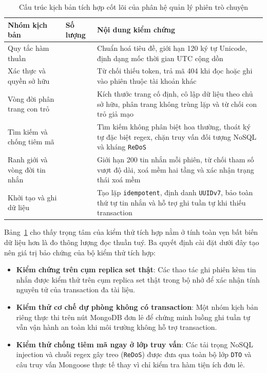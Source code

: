 \begin{table}[htbp]
\centering
\caption{Cấu trúc kịch bản tích hợp cốt lõi của phân hệ quản lý phiên trò chuyện}
\label{tab:kich-ban-tich-hop-session}
\small
\begin{tabularx}{\textwidth}{
  >{\raggedright\arraybackslash}p{4.4cm}
  >{\raggedleft\arraybackslash}p{1.9cm}
  >{\raggedright\arraybackslash}X
}
\toprule
\textbf{Nhóm kịch bản} & \textbf{Số lượng} & \textbf{Nội dung kiểm chứng} \\
\midrule
Quy tắc hàm thuần & 5 & Chuẩn hoá tiêu đề, giới hạn 120 ký tự Unicode, định dạng mốc thời gian UTC cộng dồn \\
\midrule
Xác thực và quyền sở hữu & 6 & Từ chối thiếu token, trả mã 404 khi đọc hoặc ghi vào phiên thuộc tài khoản khác \\
\midrule
Vòng đời phân trang con trỏ & 5 & Kích thước trang cố định, cô lập dữ liệu theo chủ sở hữu, phân trang không trùng lặp và từ chối con trỏ giả mạo \\
\midrule
Tìm kiếm và chống tiêm mã & 4 & Tìm kiếm không phân biệt hoa thường, thoát ký tự đặc biệt regex, chặn truy vấn đối tượng NoSQL và kháng \texttt{ReDoS} \\
\midrule
Ranh giới và vòng đời tin nhắn & 6 & Giới hạn 200 tin nhắn mỗi phiên, từ chối tham số vượt độ dài, xoá mềm hai tầng và xác nhận trạng thái xoá mềm \\
\midrule
Khởi tạo và ghi dữ liệu & 4 & Tạo lặp \texttt{idempotent}, định danh \texttt{UUIDv7}, bảo toàn thứ tự tin nhắn và hỗ trợ ghi tuần tự khi thiếu transaction \\
\bottomrule
\end{tabularx}
\end{table}

Bảng~\ref{tab:kich-ban-tich-hop-session} cho thấy trọng tâm của kiểm thử tích hợp nằm ở tính toàn vẹn bất biến dữ liệu hơn là đo thông lượng đọc thuần tuý. Ba quyết định cài đặt dưới đây tạo nên giá trị bảo chứng của bộ kiểm thử tích hợp:

\begin{itemize}
\item[--] \textbf{Kiểm chứng trên cụm replica set thật}: Các thao tác ghi phiên kèm tin nhắn được kiểm thử trên cụm replica set thật trong bộ nhớ để xác nhận tính nguyên tử của transaction đa tài liệu.
\item[--] \textbf{Kiểm thử cơ chế dự phòng không có transaction}: Một nhóm kịch bản riêng thực thi trên nút MongoDB đơn lẻ để chứng minh luồng ghi tuần tự vẫn vận hành an toàn khi môi trường không hỗ trợ transaction.
\item[--] \textbf{Kiểm thử chống tiêm mã ngay ở lớp truy vấn}: Các tải trọng NoSQL injection và chuỗi regex gây treo (\texttt{ReDoS}) được đưa qua toàn bộ lớp \texttt{DTO} và câu truy vấn Mongoose thực tế thay vì chỉ kiểm tra hàm tiện ích đơn lẻ.
\end{itemize}

